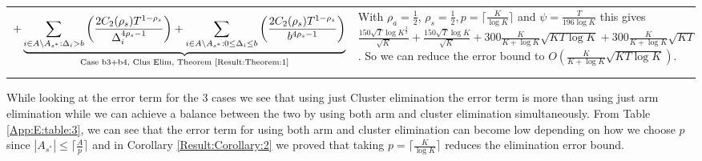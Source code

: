\begin{table}
\begin{center}
\begin{tabular}{p{1.4cm}p{10.3cm}p{3.5cm}}
\begin{align*}
 + \underbrace{\sum_{i\in A\setminus A_{s^*}:\Delta_{i} > b}\bigg(\dfrac{2C_{2}(\rho_{s})T^{1-\rho_{s}}}{\Delta_{i}^{4\rho_{s}-1}} \bigg)+ \sum_{i\in A\setminus A_{s^*}:0\leq\Delta_{i}\leq b}\bigg(\dfrac{2C_{2}(\rho_{s})T^{1-\rho_{s}}}{b^{4\rho_{s} -1}} \bigg)}_{\text{Case b3+b4, Clus Elim, Theorem \ref{Result:Theorem:1}}} \end{align*} & With $\rho_{a}=\frac{1}{2}$, $\rho_{s}=\frac{1}{2}, p=\lceil \frac{K}{\log K}\rceil$ and $\psi=\frac{T}{196 \log K}$ this gives $\frac{150 \sqrt{T}\log K^{\frac{3}{2}} }{\sqrt{K}} + \frac{150 \sqrt{T}\log K}{\sqrt{K}} + 300 \frac{K}{K+\log K}\sqrt{KT\log K} + 300 \frac{K}{K+\log K}\sqrt{KT}$. So we can reduce the error bound to $O(\frac{K}{K+\log K}\sqrt{KT\log K})$.
\end{tabular}
\end{center}	
\end{table}
 
 While looking at the error term for the $3$ cases we see that using just Cluster elimination the error term is more than using just arm elimination while we can achieve a balance between the two by using both arm and cluster  elimination simultaneously. From Table \ref{App:E:table:3}, we can see that the error term for using both arm and cluster elimination can become low depending on how we choose $p$ since $|A_{s^{*}}|\leq \lceil\frac{A}{p}\rceil$ and in Corollary \ref{Result:Corollary:2} we proved that taking $p=\big\lceil \frac{K}{\log K} \big\rceil$ reduces the elimination error bound.
 
 
 
